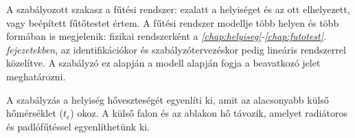 A szabályozott szakasz a fűtési rendszer: ezalatt a helyiséget és az ott elhelyezett, vagy beépített fűtőtestet értem. A fűtési rendszer modellje több helyen és több formában is megjelenik: fizikai rendszerként a \textit{\ref{chap:helyiseg}-\ref{chap:futotest}. fejezetekben}, az identifikációkor és szabályzótervezéskor pedig lineáris rendszerrel közelítve. A szabályzó ez alapján a modell alapján fogja a beavatkozó jelet meghatározni.



 


A szabályzás a helyiség hőveszteségét egyenlíti ki, amit az alacsonyabb külső hőmérséklet ($t_e$) okoz. A külső falon és az ablakon hő távozik, amelyet radiátoros és padlófűtéssel egyenlíthetünk ki.

%
%
%
%

%
